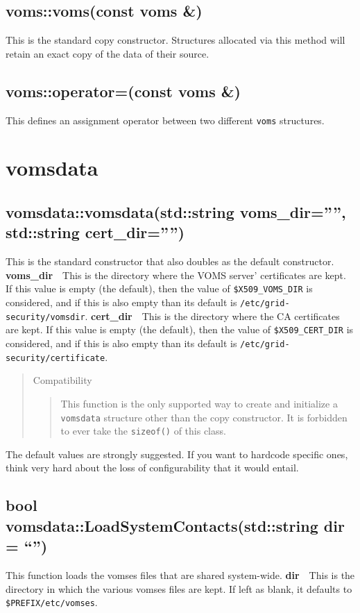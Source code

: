 \documentclass[a4paper]{book}
\newenvironment{compatibility}{\begin{quote}\color{red}Compatibility\begin{quote}}{\end{quote}\color{black}\end{quote}}
\newcommand{\parameter}[2]{\newline\textbf{#1}\ \ #2}
\begin{document}
\subsection{voms::voms(const voms \&)}
This is the standard copy constructor.  Structures allocated via this
method will retain an exact copy of the data of their source.

\subsection{voms::operator=(const voms \&)}
This defines an assignment operator between two different
\texttt{voms} structures.

\section{vomsdata}
\subsection{vomsdata::vomsdata(std::string voms\_dir='''',
    std::string cert\_dir='''')}

This is the standard constructor that also doubles as the default
constructor. 
\parameter{voms\_dir}{This is the directory where the VOMS server'
certificates are kept. If this value is empty (the default), then the
value of \texttt{\$X509\_VOMS\_DIR} is considered, and if this is also
empty than its default is \texttt{/etc/grid-security/vomsdir}.}
\parameter{cert\_dir}{This is the directory where the CA certificates
are kept. If this value is empty (the default), then the value of
\texttt{\$X509\_CERT\_DIR} is considered, and if this is also empty
than its default is \texttt{/etc/grid-security/certificate}.}

\begin{compatibility}
This function is the only supported way to create and initialize a
\texttt{vomsdata} structure other than the copy constructor. It is
forbidden to ever take the \texttt{sizeof()} of this class.
\end{compatibility}

The default values are strongly suggested.  If you want to hardcode
specific ones, think very hard about the loss of configurability that
it would entail.

\subsection{bool vomsdata::LoadSystemContacts(std::string dir = ``'')}
This function loads the vomses files that are shared system-wide.
\parameter{dir}{This is the directory in which the various vomses files are
kept.  If left as blank, it defaults to \texttt{\$PREFIX/etc/vomses}.}
\end{document}
